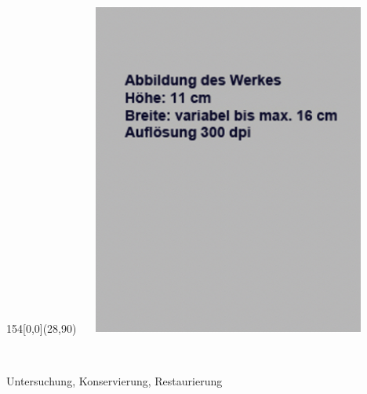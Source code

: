 \begin{titlepage}
\begin{textblock}{154}[0,0](28,90)
	\includegraphics[height=11cm,width=10cm]{bilder/titelseite/testbild.jpg} 	%
\end{textblock}



\begin{flushleft}

\vspace*{30mm}

\fontsize{26pt}{28pt}\selectfont 
\textbf{\titel}			\\							%
\vspace{2mm}

\fontsize{16pt}{20pt}\selectfont\vspace{0.3em}
Untersuchung, Konservierung, Restaurierung		\\							%
\vspace{5mm}






\end{flushleft}
\end{titlepage}
